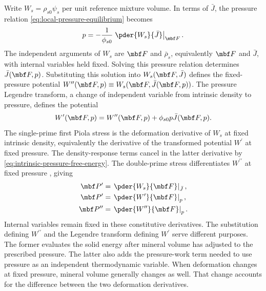 Write \(W_s=\rho_{s0}\psi_s\) per unit reference mixture volume.  In terms
of \(\bar J\), the pressure relation \eqref{eq:local-pressure-equilibrium}
becomes
\begin{equation}
 p=-\frac{1}{\phi_{s0}}
 \left.\pder{W_s}{\bar J}\right|_{\mbf F}.
 \label{eq:intrinsic-pressure-free-energy}
\end{equation}
The independent arguments of \(W_s\) are \(\mbf F\) and
\(\bar\rho_s\), equivalently \(\mbf F\) and \(\bar J\), with internal
variables held fixed.  Solving this pressure relation determines
\(\bar J(\mbf F,p)\).  Substituting this solution into
\(W_s(\mbf F,\bar J)\) defines the fixed-pressure potential
\(W^{\prime\prime}(\mbf F,p)
\equiv W_s(\mbf F,\bar J(\mbf F,p))\).  The pressure Legendre transform, a
change of independent variable from intrinsic density to pressure, defines
the potential
\begin{equation}
 W^{\prime}(\mbf F,p)
 =W^{\prime\prime}(\mbf F,p)+\phi_{s0}p\bar J(\mbf F,p).
 \label{eq:pressure-legendre-potential}
\end{equation}
The single-prime first Piola stress is the deformation derivative of
\(W_s\) at fixed intrinsic density, equivalently the derivative of the
transformed potential \(W^{\prime}\) at fixed pressure.  The density-response
terms cancel in the latter derivative by
\eqref{eq:intrinsic-pressure-free-energy}.  The double-prime stress differentiates \(W^{\prime\prime}\) at
fixed pressure \citep[eqs.~(34)--(36)]{fosterxu2025}, giving
\begin{align}
 \mbf P^{\prime}
 &=\left.\pder{W_s}{\mbf F}\right|_{\bar J}
 ,\label{eq:single-prime-fixed-density-conjugate}\\
 \mbf P^{\prime}&=\left.\pder{W^{\prime}}{\mbf F}\right|_p,
 \label{eq:single-prime-energy-conjugate}\\
 \mbf P^{\prime\prime}
 &=\left.\pder{W^{\prime\prime}}{\mbf F}\right|_p.
 \label{eq:double-prime-energy-conjugate}
\end{align}
Internal variables remain fixed in these constitutive derivatives.
The substitution defining \(W^{\prime\prime}\) and the Legendre transform
defining \(W^{\prime}\) serve different purposes.  The former evaluates the
solid energy after mineral volume has adjusted to the prescribed pressure.
The latter also adds the pressure-work term needed to use pressure as an
independent thermodynamic variable.  When deformation changes at fixed
pressure, mineral volume generally changes as well.  That change accounts
for the difference between the two deformation derivatives.

